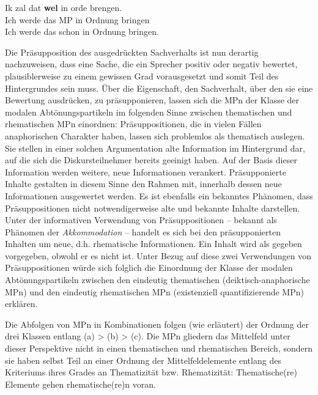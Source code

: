 \begin{exe}
	\ex\label{175} 
	\gll Ik zal dat \textbf{wel} in orde brengen.\\
	 Ich werde das MP in Ordnung bringen \\
	 \glt Ich werde das schon in Ordnung bringen. 
	 \newline
	 \hbox{}\hfill\hbox{\citet[55]{Vriendt1991}}
\end{exe}
Die Präsupposition  des ausgedrückten Sachverhalts ist nun derartig nachzuwei\-sen, dass eine Sache, die ein Sprecher positiv oder negativ bewertet, plausiblerweise zu einem gewissen Grad vorausgesetzt und somit Teil des Hintergrundes sein muss. Über die Eigenschaft, den Sachverhalt, über den sie eine Bewertung ausdrücken, zu präsupponieren, lassen sich die MPn der Klasse der modalen Abtönungspartikeln  im folgenden Sinne zwischen thematischen und rhematischen MPn einordnen: Präsuppositionen, die in vielen Fällen anaphorischen Charakter haben, lassen sich problemlos als thematisch auslegen. Sie stellen in einer solchen Argumentation alte Information im Hintergrund  dar, auf die sich die Diskursteilnehmer bereits geeinigt haben. Auf der Basis dieser Information werden weitere, neue Informationen verankert. Präsupponierte Inhalte gestalten in diesem Sinne den Rahmen mit, innerhalb dessen neue Informationen ausge\-wertet werden. Es ist ebenfalls ein bekanntes Phänomen, dass Präsuppositionen nicht notwendigerweise alte und bekannte Inhalte darstellen. Unter der informativen Verwendung von Präsuppositionen – bekannt als Phänomen der \textit{Akko\-mmodation} – handelt es sich bei den präsupponierten Inhalten um neue, d.h. rhematische Informationen. Ein Inhalt wird als gegeben vorgegeben, obwohl er es nicht ist. Unter Bezug auf diese zwei Verwendungen von Präsuppositionen würde sich folglich die Einordnung der Klasse der modalen Abtönungspartikeln zwischen den eindeutig thematischen (deiktisch-anaphorische MPn) und den eindeutig rhematischen MPn (existenziell quantifizierende MPn) erklären. 

Die Abfolgen von MPn in Kombinationen folgen (wie erläutert) der Ordnung der drei Klassen entlang (a) > (b) > (c). Die MPn gliedern das Mittelfeld unter dieser Perspektive nicht in einen thematischen und rhematischen Bereich, sondern sie haben selbst Teil an einer Ordnung der Mittelfeldelemente entlang des Kriteriums ihres Grades an Thematizität  bzw.  Rhematizität: Thematische(re) E\-lemente gehen rhematische(re)n voran. 

